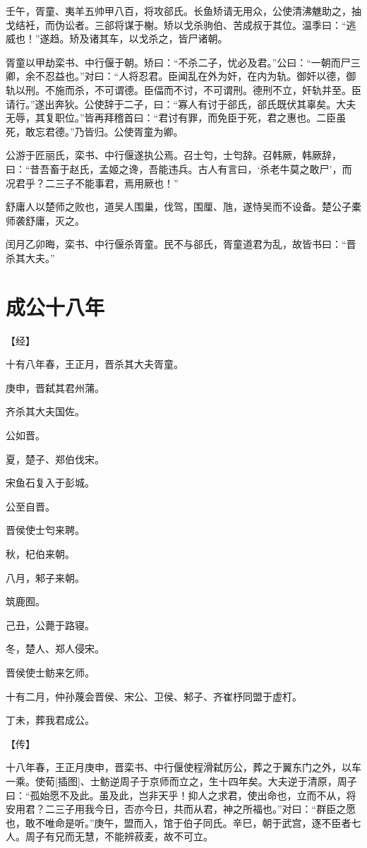 \documentclass[a4paper,12pt,UTF8,twoside]{ctexbook}
\begin{document}
壬午，胥童、夷羊五帅甲八百，将攻郤氏。长鱼矫请无用众，公使清沸魋助之，抽戈结衽，而伪讼者。三郤将谋于榭。矫以戈杀驹伯、苦成叔于其位。温季曰：“逃威也！”遂趋。矫及诸其车，以戈杀之，皆尸诸朝。

胥童以甲劫栾书、中行偃于朝。矫曰：“不杀二子，忧必及君。”公曰：“一朝而尸三卿，余不忍益也。”对曰：“人将忍君。臣闻乱在外为奸，在内为轨。御奸以德，御轨以刑。不施而杀，不可谓德。臣偪而不讨，不可谓刑。德刑不立，奸轨并至。臣请行。”遂出奔狄。公使辞于二子，曰：“寡人有讨于郤氏，郤氏既伏其辜矣。大夫无辱，其复职位。”皆再拜稽首曰：“君讨有罪，而免臣于死，君之惠也。二臣虽死，敢忘君德。”乃皆归。公使胥童为卿。

公游于匠丽氏，栾书、中行偃遂执公焉。召士匄，士匄辞。召韩厥，韩厥辞，曰：“昔吾畜于赵氏，孟姬之谗，吾能违兵。古人有言曰，‘杀老牛莫之敢尸’，而况君乎？二三子不能事君，焉用厥也！”

舒庸人以楚师之败也，道吴人围巢，伐驾，围厘、虺，遂恃吴而不设备。楚公子橐师袭舒庸，灭之。

闰月乙卯晦，栾书、中行偃杀胥童。民不与郤氏，胥童道君为乱，故皆书曰：“晋杀其大夫。”




\chapter{成公十八年}

【经】

十有八年春，王正月，晋杀其大夫胥童。

庚申，晋弑其君州蒲。

齐杀其大夫国佐。

公如晋。

夏，楚子、郑伯伐宋。

宋鱼石复入于彭城。

公至自晋。

晋侯使士匄来聘。

秋，杞伯来朝。

八月，邾子来朝。

筑鹿囿。

己丑，公薨于路寝。

冬，楚人、郑人侵宋。

晋侯使士鲂来乞师。

十有二月，仲孙蔑会晋侯、宋公、卫侯、邾子、齐崔杼同盟于虚朾。

丁未，葬我君成公。

【传】

十八年春，王正月庚申，晋栾书、中行偃使程滑弑厉公，葬之于翼东门之外，以车一乘。使荀[插图]、士鲂逆周子于京师而立之，生十四年矣。大夫逆于清原，周子曰：“孤始愿不及此。虽及此，岂非天乎！抑人之求君，使出命也，立而不从，将安用君？二三子用我今日，否亦今日，共而从君，神之所福也。”对曰：“群臣之愿也，敢不唯命是听。”庚午，盟而入，馆于伯子同氏。辛巳，朝于武宫，逐不臣者七人。周子有兄而无慧，不能辨菽麦，故不可立。
\end{document}
